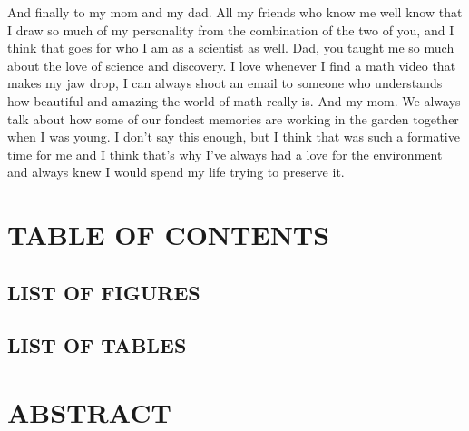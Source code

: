 \documentclass[
]{article}
\begin{document}
And finally to my mom and my dad. All my friends who know me well know that I draw so much of my personality from the combination of the two of you, and I think that goes for who I am as a scientist as well. Dad, you taught me so much about the love of science and discovery. I love whenever I find a math video that makes my jaw drop, I can always shoot an email to someone who understands how beautiful and amazing the world of math really is. And my mom. We always talk about how some of our fondest memories are working in the garden together when I was young. I don't say this enough, but I think that was such a formative time for me and I think that's why I've always had a love for the environment and always knew I would spend my life trying to preserve it.

\newpage

\hypertarget{table-of-contents}{%
\section{TABLE OF CONTENTS}\label{table-of-contents}}

\vspace{-1cm}
\tableofcontents

\newpage

\hypertarget{list-of-figures}{%
\subsection{LIST OF FIGURES}\label{list-of-figures}}

\vspace{-1.5cm}
\listoffigures

\newpage

\hypertarget{list-of-tables}{%
\subsection{LIST OF TABLES}\label{list-of-tables}}

\vspace{-1.5cm}
\listoftables

\newpage

\hypertarget{abstract}{%
\section{ABSTRACT}\label{abstract}}
\end{document}
